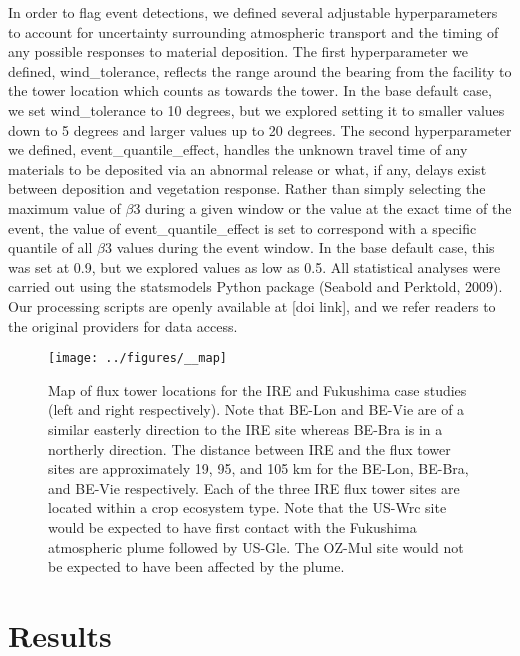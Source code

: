 \documentclass{article}
\begin{document}
In order to flag event detections, we defined several adjustable hyperparameters to account for uncertainty surrounding atmospheric transport and the timing of any possible responses to material deposition. The first hyperparameter we defined, wind\_tolerance, reflects the range around the bearing from the facility to the tower location which counts as towards the tower. In the base default case, we set wind\_tolerance to 10 degrees, but we explored setting it to smaller values down to 5 degrees and larger values up to 20 degrees. The second hyperparameter we defined, event\_quantile\_effect, handles the unknown travel time of any materials to be deposited via an abnormal release or what, if any, delays exist between deposition and vegetation response. Rather than simply selecting the maximum value of $\beta$3 during a given window or the value at the exact time of the event, the value of event\_quantile\_effect is set to correspond with a specific quantile of all $\beta$3 values during the event window. In the base default case, this was set at 0.9, but we explored values as low as 0.5. All statistical analyses were carried out using the statsmodels Python package (Seabold and Perktold, 2009). Our processing scripts are openly available at [doi link], and we refer readers to the original providers for data access.

\begin{figure}
	\centering
	\texttt{[image: ../figures/\_\_map]}
	\caption{Map of flux tower locations for the IRE and Fukushima case studies (left and right respectively). Note that BE-Lon and BE-Vie are of a similar easterly direction to the IRE site whereas BE-Bra is in a northerly direction. The distance between IRE and the flux tower sites are approximately 19, 95, and 105 km for the BE-Lon, BE-Bra, and BE-Vie respectively. Each of the three IRE flux tower sites are located within a crop ecosystem type. Note that the US-Wrc site would be expected to have first contact with the Fukushima atmospheric plume followed by US-Gle. The OZ-Mul site would not be expected to have been affected by the plume.}
	\label{fig:study_site}
\end{figure}

\section{Results}
\end{document}
